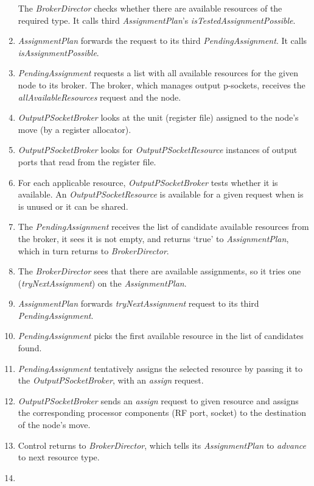 \documentclass[a4paper,twoside]{tce}
\begin{document}
\begin{enumerate}
  The \emph{BrokerDirector} checks whether there are available resources of
  the required type. It calls third \emph{AssignmentPlan}'s
  \emph{isTestedAssignmentPossible}.
\item %
  \emph{AssignmentPlan} forwards the request to its third
  \emph{PendingAssignment}. It calls \emph{isAssignmentPossible}.
\item %
  \emph{PendingAssignment} requests a list with all available resources for
  the given node to its broker. The broker, which manages output p-sockets,
  receives the \emph{allAvailableResources} request and the node.
\item %
  \emph{OutputPSocketBroker} looks at the unit (register file) assigned to
  the node's move (by a register allocator).
\item %
  \emph{OutputPSocketBroker} looks for \emph{OutputPSocketResource}
  instances of output ports that read from the register file.
\item %
  For each applicable resource, \emph{OutputPSocketBroker} tests whether it
  is available. An \emph{OutputPSocketResource} is available for a given
  request when is is unused or it can be shared.
\item %
  The \emph{PendingAssignment} receives the list of candidate available
  resources from the broker, it sees it is not empty, and returns `true' to
  \emph{AssignmentPlan}, which in turn returns to \emph{BrokerDirector}.
\item %
  The \emph{BrokerDirector} sees that there are available assignments, so it
  tries one (\emph{tryNextAssignment}) on the \emph{AssignmentPlan}.
\item %
  \emph{AssignmentPlan} forwards \emph{tryNextAssignment} request to its
  third \emph{PendingAssignment}.
\item %
  \emph{PendingAssignment} picks the first available resource in the list of
  candidates found.
\item %
  \emph{PendingAssignment} tentatively assigns the selected resource by
  passing it to the \emph{OutputPSocketBroker}, with an \emph{assign}
  request.
\item %
  \emph{OutputPSocketBroker} sends an \emph{assign} request to given
  resource and assigns the corresponding processor components (RF port,
  socket) to the destination of the node's move.
\item %
  Control returns to \emph{BrokerDirector}, which tells its
  \emph{AssignmentPlan} to \emph{advance} to next resource type.
\item %

\end{enumerate}
\end{document}
